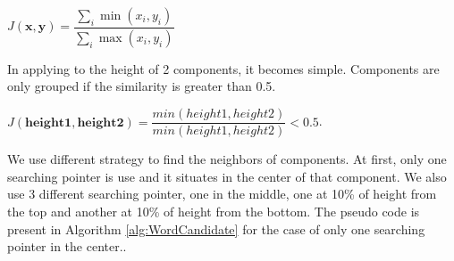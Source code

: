 \begin{center}
    $J(\mathbf{x}, \mathbf{y}) = \dfrac{\sum_i \min(x_i, y_i)}{\sum_i \max(x_i, y_i)}$ 
\end{center}
    
In applying to the height of 2 components, it becomes simple. Components are only grouped if the similarity is greater than 0.5.

\begin{center}
$J(\mathbf{height1},\mathbf{height2}) = \dfrac{min(height1,height2)}{min(height1,height2)} < 0.5$. 
\end{center}


\par We use different strategy to find the neighbors of components. At first, only one searching pointer is use and it situates in the center of that component. We also use 3 different searching pointer, one in the middle, one at 10\% of height from the top and another at 10\% of height from the bottom. 
The pseudo code is present in Algorithm \ref{alg:WordCandidate} for the case of only one searching pointer in the center..

